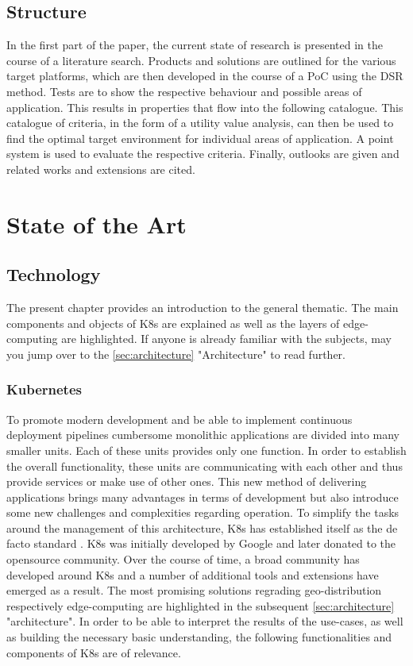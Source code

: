\documentclass[MSC,Master,english]{twbook}%
\begin{document}
\section{Structure}
\label{sec:methodology}
\label{sec:structure}
In the first part of the paper, the current state of research is presented in the course of a literature search. Products and solutions are outlined for the various target platforms, which are then developed in the course of a \ac{PoC} using the \ac{DSR} method. Tests are to show the respective behaviour and possible areas of application. This results in properties that flow into the following catalogue. This catalogue of criteria, in the form of a utility value analysis, can then be used to find the optimal target environment for individual areas of application. A point system is used to evaluate the respective criteria. Finally, outlooks are given and related works and extensions are cited.


\chapter{State of the Art}
\label{chap:current}
\section{Technology}
The present chapter provides an introduction to the general thematic. The main components and objects of \ac{K8s} are explained as well as the layers of edge-computing are highlighted. If anyone is already familiar with the subjects, may you jump over to the \autoref{sec:architecture} "Architecture" to read further.
\label{sec:technology}
\subsection{Kubernetes}
To promote modern development and be able to implement continuous deployment pipelines cumbersome monolithic applications are divided into many smaller units. Each of these units provides only one function. In order to establish the overall functionality, these units are communicating with each other and thus provide services or make use of other ones. This new method of delivering applications brings many advantages in terms of development but also introduce some new challenges and complexities regarding operation. To simplify the tasks around the management of this architecture, \ac{K8s} has established itself as the de facto standard \cite{k8ssurv}. \ac{K8s} was initially developed by Google and later donated to the opensource community. Over the course of time, a broad community has developed around \ac{K8s} and a number of additional tools and extensions have emerged as a result. The most promising solutions regrading geo-distribution respectively edge-computing are highlighted in the subsequent \autoref{sec:architecture} "architecture". In order to be able to interpret the results of the use-cases, as well as building the necessary basic understanding, the following functionalities and components of \ac{K8s} are of relevance. 
\end{document}
